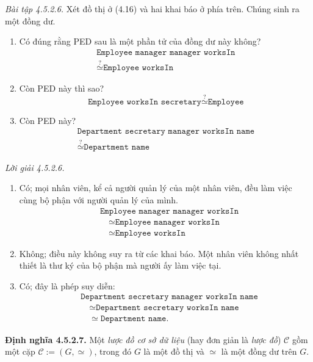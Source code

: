 \noindent\textit{Bài tập 4.5.2.6.}\keepwithnext
Xét đồ thị ở (4.16) và hai khai báo ở phía trên. Chúng sinh ra một đồng dư.
\begin{enumerate}[label=\alph*.]
\item Có đúng rằng PED sau là một phần tử của đồng dư này không?
\[
\begin{gathered}
\texttt{Employee manager manager worksIn}\\
\overset{?}{\simeq}\texttt{Employee worksIn}
\end{gathered}
\]
\item Còn PED này thì sao?
\[
\texttt{Employee worksIn secretary}\overset{?}{\simeq}\texttt{Employee}
\]
\item Còn PED này?
\[
\begin{gathered}
\texttt{Department secretary manager worksIn name}\\
\overset{?}{\simeq}\texttt{Department name}
\end{gathered}\tag*{$\diamond$}
\]
\end{enumerate}

\noindent\textit{Lời giải 4.5.2.6.}\keepwithnext
\begin{enumerate}[label=\alph*.]
\item Có; mọi nhân viên, kể cả người quản lý của một nhân viên, đều làm việc cùng bộ phận với người quản lý của mình.
\[
\begin{aligned}
&\texttt{Employee manager manager worksIn}\\
&\quad\simeq\texttt{Employee manager worksIn}\\
&\quad\simeq\texttt{Employee worksIn}
\end{aligned}
\]
\item Không; điều này không suy ra từ các khai báo. Một nhân viên không nhất thiết là thư ký của bộ phận mà người ấy làm việc tại.
\item Có; đây là phép suy diễn:
\[
\begin{aligned}
&\texttt{Department secretary manager worksIn name}\\
&\quad\simeq\texttt{Department secretary worksIn name}\\
&\quad\simeq\texttt{Department name}.
\end{aligned}\tag*{$\blacklozenge$}
\]
\end{enumerate}

\noindent\textbf{Định nghĩa 4.5.2.7.}\keepwithnext
Một \emph{lược đồ cơ sở dữ liệu} (hay đơn giản là \emph{lược đồ}) $\mathcal C$ gồm một cặp $\mathcal C:=(G,\simeq)$, trong đó $G$ là một đồ thị và $\simeq$ là một đồng dư trên $G$.

